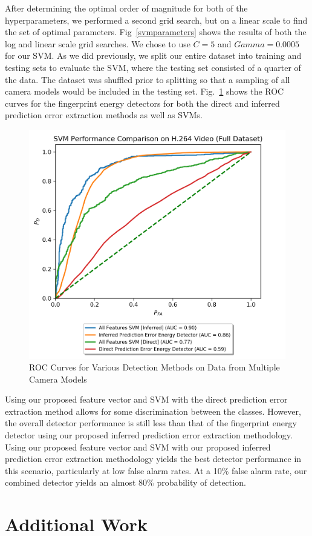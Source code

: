 After determining the optimal order of magnitude for both of the hyperparameters, we performed a second grid search, but on a linear scale to find the set of optimal parameters. Fig~\ref{svmparameters} shows the results of both the log and linear scale grid searches. We chose to use $C = 5$ and $Gamma = 0.0005$ for our SVM. As we did previously, we split our entire dataset into training and testing sets to evaluate the SVM, where the testing set consisted of a quarter of the data. The dataset was shuffled prior to splitting so that a sampling of all camera models would be included in the testing set. Fig.~\ref{fullDSSVM} shows the ROC curves for the fingerprint energy detectors for both the direct and inferred prediction error extraction methods as well as SVMs.
%
\begin{figure}[htbp]
\centerline{\includegraphics[width=0.7\linewidth]{ExperimentalResults/full_ds_compare_roc.png}}
\caption{ROC Curves for Various Detection Methods on Data from Multiple Camera Models}
\label{fullDSSVM}
\end{figure}

Using our proposed feature vector and SVM with the direct prediction error extraction method allows for some discrimination between the classes. However, the overall detector performance is still less than that of the fingerprint energy detector using our proposed inferred prediction error extraction methodology. Using our proposed feature vector and SVM with our proposed inferred prediction error extraction methodology yields the best detector performance in this scenario, particularly at low false alarm rates. At a 10\% false alarm rate, our combined detector yields an almost 80\% probability of detection.

\section{Additional Work}

